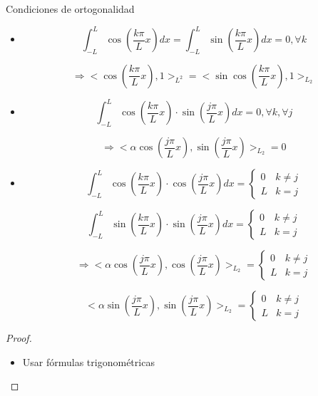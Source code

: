 		\begin{theorem}{Condiciones de ortogonalidad}

			\begin{itemize}

				\item
				\[ \int^{L}_{-L} \cos \left( \frac{k \pi}{L} x \right) dx = \int^{L}_{-L} \sin \left( \frac{k \pi}{L} x \right) dx = 0, \forall k \]

				\[\Rightarrow <\cos \left( \frac{k \pi}{L} x \right),1>_{L^2} = < \sin \cos \left( \frac{k \pi}{L} x \right),1>_{L_2}\]

				\item
				\[ \int^{L}_{-L} \cos \left( \frac{k \pi}{L} x \right) \cdot \sin \left( \frac{j \pi}{L} x \right) dx = 0, \forall k, \forall j\]

				\[\Rightarrow <\alpha \cos \left( \frac{j \pi}{L} x \right), \sin \left( \frac{j \pi}{L} x \right) >_{L_2} = 0   \]

				\item
				\[ \int^{L}_{-L} \cos \left( \frac{k \pi}{L} x \right) \cdot \cos \left( \frac{j \pi}{L} x \right) dx = \begin{cases}
				0 & k \neq j \\
				L & k = j \end{cases} \]

				\[ \int^{L}_{-L} \sin \left( \frac{k \pi}{L} x \right) \cdot \sin \left( \frac{j \pi}{L} x \right) dx = \begin{cases}
				0 & k \neq j \\
				L & k = j \end{cases} \]

				\[\Rightarrow <\alpha \cos \left( \frac{j \pi}{L} x \right), \cos \left( \frac{j \pi}{L} x \right) >_{L_2} = \begin{cases}
				0 & k \neq j \\
				L & k = j \end{cases} \]

				\[ <\alpha \sin \left( \frac{j \pi}{L} x \right), \sin \left( \frac{j \pi}{L} x \right) >_{L_2} = \begin{cases}
				0 & k \neq j \\
				L & k = j \end{cases} \]

			\end{itemize}

			\begin{proof}

				\begin{itemize}
					\item Usar fórmulas trigonométricas


\end{itemize}
\end{proof}
\end{theorem}
